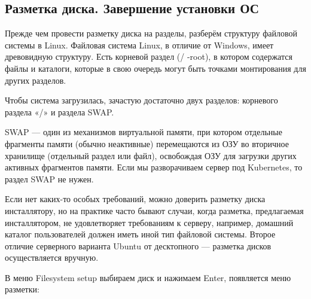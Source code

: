 \documentclass[14pt, a4paper]{article}
\begin{document}
\subsection*{Разметка диска. Завершение установки ОС}

Прежде чем провести разметку диска на разделы, разберём структуру файловой системы в
Linux. Файловая система Linux, в отличие от Windows, имеет древовидную структуру. Есть корневой
раздел (/ -root), в котором содержатся файлы и каталоги, которые в свою очередь могут быть точками
монтирования для других разделов.

Чтобы система загрузилась, зачастую достаточно двух разделов: корневого раздела «/» и
раздела SWAP.

SWAP — один из механизмов виртуальной памяти, при котором отдельные фрагменты памяти
(обычно неактивные) перемещаются из ОЗУ во вторичное хранилище (отдельный раздел или файл),
освобождая ОЗУ для загрузки других активных фрагментов памяти. Если мы разворачиваем сервер
под Kubernetes, то раздел SWAP не нужен.

Если нет каких-то особых требований, можно доверить разметку диска инсталлятору, но на
практике часто бывают случаи, когда разметка, предлагаемая инсталлятором, не удовлетворяет
требованиям к серверу, например, домашний каталог пользователей должен иметь иной тип
файловой системы. Второе отличие серверного варианта Ubuntu от десктопного — разметка дисков
осуществляется вручную.

В меню Filesystem setup выбираем диск и нажимаем Enter, появляется меню разметки:

\begin{figure}[H]%
    \centering
    \label{1.5} %
\end{figure}
\end{document}
